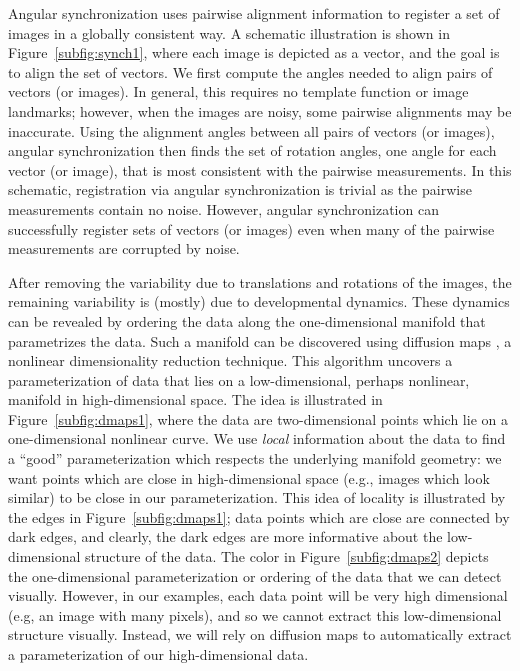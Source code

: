 \documentclass{pnastwo}
\begin{document}
\begin{article}
Angular synchronization uses pairwise alignment information to register a set of images in a globally consistent way.
%
A schematic illustration is shown in Figure~\ref{subfig:synch1}, where each image is depicted as a vector, and the goal is to align the set of vectors. 
%
We first compute the angles needed to align pairs of vectors (or images).
%
In general, this requires no template function or image landmarks; however, when the images are noisy, some pairwise alignments may be inaccurate.
%
Using the alignment angles between all pairs of vectors (or images), angular synchronization then finds the set of rotation angles, one angle for each vector (or image), that is most consistent with the pairwise measurements. 
%
In this schematic, registration via angular synchronization is trivial as the pairwise measurements contain no noise. 
%
However, angular synchronization can successfully register sets of vectors (or images) even when many of the pairwise measurements are corrupted by noise. 
%

%
After removing the variability due to translations and rotations of the images, the remaining variability is (mostly) due to developmental dynamics.
% 
These dynamics can be revealed by ordering the data along the one-dimensional manifold that parametrizes the data. 
%
Such a manifold can be discovered using diffusion maps \cite{coifman2005geometric}, a nonlinear dimensionality reduction technique.
%
This algorithm uncovers a parameterization of data that lies on a low-dimensional, perhaps nonlinear, manifold in high-dimensional space. 
%
The idea is illustrated in Figure~\ref{subfig:dmaps1}, where the data are two-dimensional points which lie on a one-dimensional nonlinear curve. 
%
We use {\it local} information about the data to find a ``good'' parameterization which respects the underlying manifold geometry: we want points which are close in high-dimensional space (e.g., images which look similar) to be close in our parameterization.
%
This idea of locality is illustrated by the edges in Figure~\ref{subfig:dmaps1}; data points which are close are connected by dark edges, and clearly, the dark edges are more informative about the low-dimensional structure of the data. 
%
The color in Figure~\ref{subfig:dmaps2} depicts the one-dimensional parameterization or ordering of the data that we can detect visually.
%
However, in our examples, each data point will be very high dimensional (e.g, an image with many pixels), and so we cannot extract this low-dimensional structure visually.
%
Instead, we will rely on diffusion maps to automatically extract a parameterization of our high-dimensional data.
%


\end{article}
\end{document}
